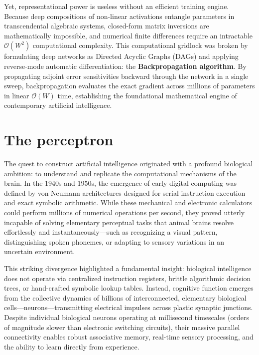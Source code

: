 Yet, representational power is useless without an efficient training engine. Because deep compositions of non-linear activations entangle parameters in transcendental algebraic systems, closed-form matrix inversions are mathematically impossible, and numerical finite differences require an intractable $\mathcal{O}(W^2)$ computational complexity. This computational gridlock was broken by formulating deep networks as Directed Acyclic Graphs (DAGs) and applying reverse-mode automatic differentiation: the \textbf{Backpropagation algorithm}. By propagating adjoint error sensitivities backward through the network in a single sweep, backpropagation evaluates the exact gradient across millions of parameters in linear $\mathcal{O}(W)$ time, establishing the foundational mathematical engine of contemporary artificial intelligence.

\section{The perceptron}
\label{sec:perceptron_and_linear_separability}

The quest to construct artificial intelligence originated with a profound biological ambition: to understand and replicate the computational mechanisms of the brain. In the 1940s and 1950s, the emergence of early digital computing was defined by von Neumann architectures designed for serial instruction execution and exact symbolic arithmetic. While these mechanical and electronic calculators could perform millions of numerical operations per second, they proved utterly incapable of solving elementary perceptual tasks that animal brains resolve effortlessly and instantaneously---such as recognizing a visual pattern, distinguishing spoken phonemes, or adapting to sensory variations in an uncertain environment.

This striking divergence highlighted a fundamental insight: biological intelligence does not operate via centralized instruction registers, brittle algorithmic decision trees, or hand-crafted symbolic lookup tables. Instead, cognitive function emerges from the collective dynamics of billions of interconnected, elementary biological cells---neurons---transmitting electrical impulses across plastic synaptic junctions. Despite individual biological neurons operating at millisecond timescales (orders of magnitude slower than electronic switching circuits), their massive parallel connectivity enables robust associative memory, real-time sensory processing, and the ability to learn directly from experience.

